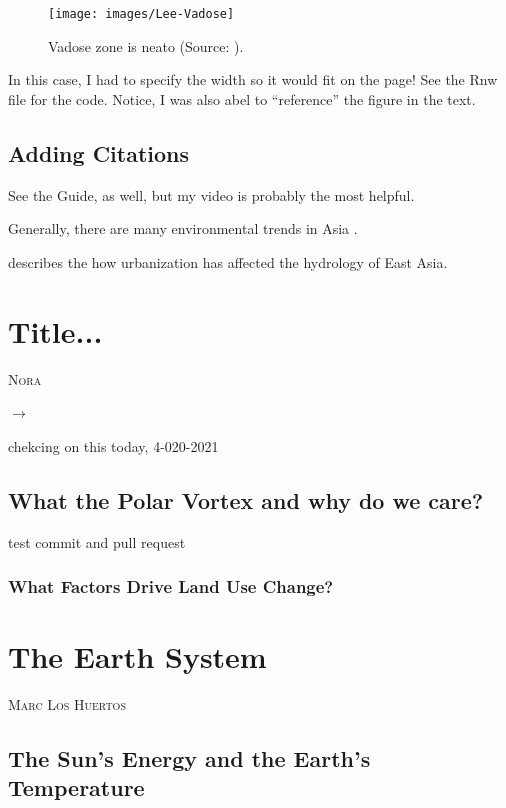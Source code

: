 \documentclass{book}\usepackage{knitr}
\makeatletter
\newcommand{\chapterauthor}[1]{%
  {\parindent0pt\vspace*{-25pt}%
  \linespread{1.1}\large\scshape#1%
  \par\nobreak\vspace*{35pt}}
  \@afterheading%
}
\makeatother
\begin{document}
\begin{figure}
\texttt{[image: images/Lee-Vadose]}
\caption{Vadose zone is neato (Source: \citet{lee2017fifty}).}
\label{fig:vadose}
\end{figure}

In this case, I had to specify the width so it would fit on the page!  See the Rnw file for the code. Notice, I was also abel to ``reference'' the figure in the text.

\section{Adding Citations}

See the Guide, as well, but my video is probably the most helpful.


Generally, there are many environmental trends in Asia \citep{imura2005urban}.

\citet{imura2005urban} describes the how urbanization has affected the hydrology of East Asia. 
 

\chapter{Title...}

\chapterauthor{Nora}

$\rightarrow$

chekcing on this today, 4-020-2021

\section{What the Polar Vortex and why do we care?}

test commit and pull request 


\subsection{What Factors Drive Land Use Change?}





\mainmatter


\chapter{The Earth System}\label{earthsystem}

\chapterauthor{Marc Los Huertos}

\section{The Sun's Energy and the Earth's Temperature}
\end{document}
